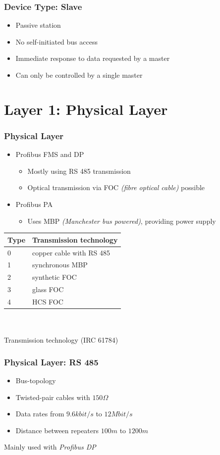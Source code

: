\documentclass{beamer}
\begin{document}
\begin{frame}
  \frametitle{Device Type: Slave}
  \begin{itemize}
    \item Passive station
    \item No self-initiated bus access
    \item Immediate response to data requested by a master
    \item Can only be controlled by a single master
  \end{itemize}
\end{frame}

\section{Layer 1: Physical Layer}
\begin{frame}
  \frametitle{Physical Layer}
  \begin{itemize}
    \item Profibus FMS and DP
      \begin{itemize}
        \item Mostly using RS 485 transmission
        \item Optical transmission via FOC \textit{(fibre optical cable)} possible
      \end{itemize}
    \item Profibus PA
      \begin{itemize}
        \item Uses MBP \textit{(Manchester bus powered)}, providing power supply
      \end{itemize}
  \end{itemize}
  \center
  \footnotesize
  \begin{tabular}[h]{l|l}
    \textbf{Type} & \textbf{Transmission technology} \\
    \hline
    0             & copper cable with RS 485 \\
    1             & synchronous MBP \\
    2             & synthetic FOC \\
    3             & glass FOC \\
    4             & HCS FOC
  \end{tabular} \\
  \hfill \\
  \normalsize
  Transmission technology (IRC 61784)~\cite{profibusmanual}
\end{frame}

\begin{frame}
  \frametitle{Physical Layer: RS 485}
  \begin{itemize}
    \item Bus-topology
    \item Twisted-pair cables with $150\Omega$
    \item Data rates from $9.6kbit/s$ to $12Mbit/s$
    \item Distance between repeaters $100m$ to $1200m$
  \end{itemize}
  Mainly used with \textit{Profibus DP}
\end{frame}
\end{document}
